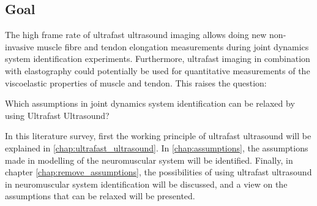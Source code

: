 \subsection*{Goal}
The high frame rate of ultrafast ultrasound imaging allows doing new non-invasive muscle fibre and tendon elongation measurements during joint dynamics system identification experiments. Furthermore, ultrafast imaging in combination with elastography could potentially be used for quantitative measurements of the viscoelastic properties of muscle and tendon. This raises the question: 
\begin{displayquote}
Which assumptions in joint dynamics system identification can be relaxed by using Ultrafast Ultrasound?
\end{displayquote}

In this literature survey, first the working principle of ultrafast ultrasound will be explained in \autoref{chap:ultrafast_ultrasound}. In \autoref{chap:assumptions}, the assumptions made in modelling of the neuromuscular system will be identified. Finally, in chapter \ref{chap:remove_assumptions}, the possibilities of using ultrafast ultrasound in neuromuscular system identification will be discussed, and a view on the assumptions that can be relaxed will be presented. %



